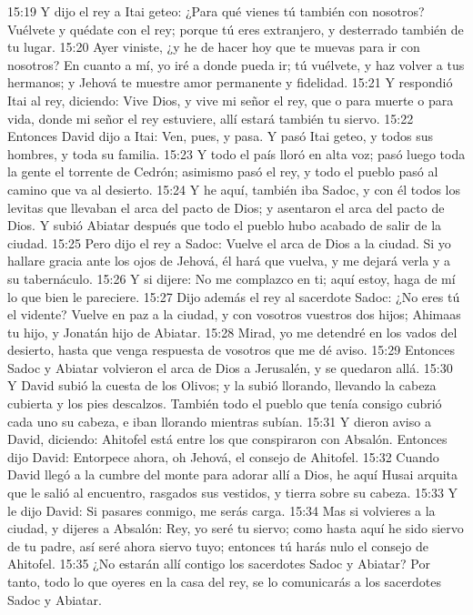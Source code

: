 15:19 Y dijo el rey a Itai geteo: ¿Para qué vienes tú también con nosotros? Vuélvete y quédate con el rey; porque tú eres extranjero, y desterrado también de tu lugar.  
15:20 Ayer viniste, ¿y he de hacer hoy que te muevas para ir con nosotros? En cuanto a mí, yo iré a donde pueda ir; tú vuélvete, y haz volver a tus hermanos; y Jehová te muestre amor permanente y fidelidad.  
15:21 Y respondió Itai al rey, diciendo: Vive Dios, y vive mi señor el rey, que o para muerte o para vida, donde mi señor el rey estuviere, allí estará también tu siervo.  
15:22 Entonces David dijo a Itai: Ven, pues, y pasa. Y pasó Itai geteo, y todos sus hombres, y toda su familia.  
15:23 Y todo el país lloró en alta voz; pasó luego toda la gente el torrente de Cedrón; asimismo pasó el rey, y todo el pueblo pasó al camino que va al desierto.  
15:24 Y he aquí, también iba Sadoc, y con él todos los levitas que llevaban el arca del pacto de Dios; y asentaron el arca del pacto de Dios. Y subió Abiatar después que todo el pueblo hubo acabado de salir de la ciudad.  
15:25 Pero dijo el rey a Sadoc: Vuelve el arca de Dios a la ciudad. Si yo hallare gracia ante los ojos de Jehová, él hará que vuelva, y me dejará verla y a su tabernáculo.  
15:26 Y si dijere: No me complazco en ti; aquí estoy, haga de mí lo que bien le pareciere.  
15:27 Dijo además el rey al sacerdote Sadoc: ¿No eres tú el vidente? Vuelve en paz a la ciudad, y con vosotros vuestros dos hijos; Ahimaas tu hijo, y Jonatán hijo de Abiatar.  
15:28 Mirad, yo me detendré en los vados del desierto, hasta que venga respuesta de vosotros que me dé aviso.  
15:29 Entonces Sadoc y Abiatar volvieron el arca de Dios a Jerusalén, y se quedaron allá.  
15:30 Y David subió la cuesta de los Olivos; y la subió llorando, llevando la cabeza cubierta y los pies descalzos. También todo el pueblo que tenía consigo cubrió cada uno su cabeza, e iban llorando mientras subían.  
15:31 Y dieron aviso a David, diciendo: Ahitofel está entre los que conspiraron con Absalón. Entonces dijo David: Entorpece ahora, oh Jehová, el consejo de Ahitofel.  
15:32 Cuando David llegó a la cumbre del monte para adorar allí a Dios, he aquí Husai arquita que le salió al encuentro, rasgados sus vestidos, y tierra sobre su cabeza.  
15:33 Y le dijo David: Si pasares conmigo, me serás carga.  
15:34 Mas si volvieres a la ciudad, y dijeres a Absalón: Rey, yo seré tu siervo; como hasta aquí he sido siervo de tu padre, así seré ahora siervo tuyo; entonces tú harás nulo el consejo de Ahitofel. 
15:35 ¿No estarán allí contigo los sacerdotes Sadoc y Abiatar? Por tanto, todo lo que oyeres en la casa del rey, se lo comunicarás a los sacerdotes Sadoc y Abiatar.  
